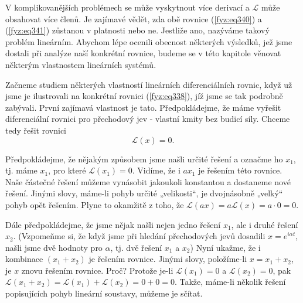 {    V komplikovanějších problémech se může vyskytnout více derivací a \(\mathscr{L}\) může 
    obsahovat více členů. Je zajímavé vědět, zda obě rovnice (\ref{fyz:eq340}) a (\ref{fyz:eq341}) 
    zůstanou v platnosti nebo ne. Jestliže ano, nazýváme takový problém lineárním. Abychom lépe 
    ocenili obecnost některých výsledků, jež jsme dostali při analýze naší konkrétní rovnice, 
    budeme se v této kapitole věnovat některým vlastnostem lineárních systémů.
    
    Začneme studiem některých vlastností lineárních diferenciálních rovnic, když už jsme je 
    ilustrovali na konkrétní rovnici (\ref{fyz:eq338}), jíž jsme se tak podrobně zabývali. První 
    zajímavá vlastnost je tato. Předpokládejme, že máme vyřešit diferenciální rovnici pro 
    přechodový jev - vlastní kmity bez budicí síly. Chceme tedy řešit rovnici
    \begin{equation}\label{fyz:eq342}
      \mathscr{L}(x) = 0.
    \end{equation}
    
    Předpokládejme, že nějakým způsobem jsme našli určité řešení a označme ho \(x_1\), tj. máme 
    \(x_1\), pro které \(\mathscr{L}(x_1) = 0\). Vidíme, že i \(ax_1\) je řešením této rovnice. 
    Naše částečné řešení můžeme vynásobit jakoukoli konstantou a dostaneme nové řešení. Jinými 
    slovy, máme-li pohyb určité „velikosti“, je dvojnásobně „velký“ pohyb opět řešením. Plyne to 
    okamžitě z toho, že \(\mathscr{L}(ax) = a\mathscr{L}(x) = a \cdot 0 = 0\).
    
    Dále předpokládejme, že jsme nějak našli nejen jedno řešení \(x_1\), ale i druhé řešení 
    \(x_2\). (Vzpomeňme si, že když jsme při hledání přechodových jevů dosadili \(x =e^{i\alpha 
    t}\), našli jsme dvě hodnoty pro \(\alpha\), tj. dvě řešení \(x_1\) a \(x_2\)) Nyní ukažme, že 
    i kombinace \((x_1 + x_2)\) je řešením rovnice. Jinými slovy, položíme-li \(x = x_1 + x_2\), je 
    \(x\) znovu řešením rovnice. Proč? Protože je-li \(\mathscr{L}(x_1) = 0\) a \(\mathscr{L}(x_2) 
    = 0\), pak \(\mathscr{L}(x_1 + x_2) = \mathscr{L}(x_1) + \mathscr{L}(x_2) = 0 + 0 = 0\). Takže, 
    máme-li několik řešení popisujících pohyb lineární soustavy, můžeme je sčítat. 
    
}

